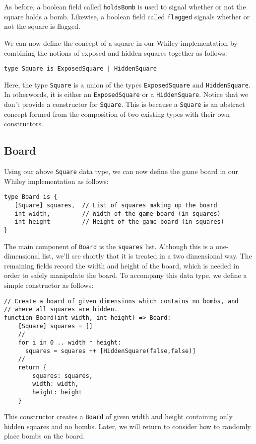 As before, a boolean field called \lstinline{holdsBomb} is used to signal whether or not the square holds a bomb.  Likewise, a boolean field called \lstinline{flagged} signals whether or not the square is flagged.  

We can now define the concept of a square in our Whiley implementation by combining the notions of exposed and hidden squares together as follows:

\begin{lstlisting}
type Square is ExposedSquare | HiddenSquare
\end{lstlisting}

Here, the type \lstinline{Square} is a union of the types \lstinline{ExposedSquare} and \lstinline{HiddenSquare}.  In otherwords, it is either an \lstinline{ExposedSquare} or a \lstinline{HiddenSquare}.  Notice that we don't provide a constructor for \lstinline{Square}.  This is because a \lstinline{Square} is an abstract concept formed from the composition of two existing types with their own constructors.

\subsection{Board}

Using our above \lstinline{Square} data type, we can now define the game board in our Whiley implementation as follows:

\begin{lstlisting}
type Board is {
   [Square] squares,  // List of squares making up the board
   int width,         // Width of the game board (in squares)
   int height         // Height of the game board (in squares)
}
\end{lstlisting}

The main component of \lstinline{Board} is the \lstinline{squares} list.  Although this is a one-dimensional list, we'll see shortly that it is treated in a two dimensional way.  The remaining fields record the width and height of the board, which is needed in order to safely manipulate the board.  To accompany this data type, we define a simple constructor as follows:
\begin{lstlisting}
// Create a board of given dimensions which contains no bombs, and
// where all squares are hidden.
function Board(int width, int height) => Board:
    [Square] squares = []
    //
    for i in 0 .. width * height:
      squares = squares ++ [HiddenSquare(false,false)]
    //
    return {
        squares: squares,
        width: width,
        height: height
    }
\end{lstlisting}
This constructor creates a \lstinline{Board} of given width and height containing only hidden squares and no bombs.  Later, we will return to consider how to randomly place bombs on the board.

